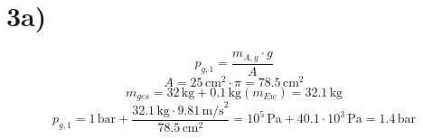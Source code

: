 

\section*{3a)}
\[
p_{g,1} = \frac{m_{A,g} \cdot g}{A}
\]
\[
A = 25 \, \text{cm}^2 \cdot \pi = 78.5 \, \text{cm}^2
\]
\[
m_{ges} = 32 \, \text{kg} + 0.1 \, \text{kg} (m_{Ew}) = 32.1 \, \text{kg}
\]
\[
p_{g,1} = 1 \, \text{bar} + \frac{32.1 \, \text{kg} \cdot 9.81 \, \text{m/s}^2}{78.5 \, \text{cm}^2} = 10^5 \, \text{Pa} + 40.1 \cdot 10^3 \, \text{Pa} = 1.4 \, \text{bar}
\]